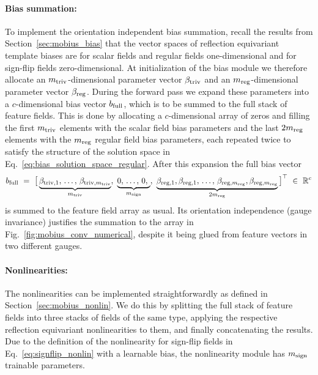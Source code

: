 \paragraph{Bias summation:}
To implement the orientation independent bias summation, recall the results from Section~\ref{sec:mobius_bias} that the vector spaces of reflection equivariant template biases are for scalar fields and regular fields one-dimensional and for sign-flip fields zero-dimensional.
At initialization of the bias module we therefore allocate an $m_{\textup{triv}}$-dimensional parameter vector $\beta_{\textup{triv}}$ and an $m_{\textup{reg}}$-dimensional parameter vector $\beta_{\textup{reg}}$.
During the forward pass we expand these parameters into a $c$-dimensional bias vector $b_{\textup{full}}$, which is to be summed to the full stack of feature fields.
This is done by allocating a $c$-dimensional array of zeros and filling the first $m_{\textup{triv}}$ elements with the scalar field bias parameters and the last $2m_{\textup{reg}}$ elements with the $m_{\textup{reg}}$ regular field bias parameters, each repeated twice to satisfy the structure of the solution space in Eq.~\eqref{eq:bias_solution_space_regular}.
After this expansion the full bias vector
\begin{align}
    b_{\textup{full}}\ =\ \big[
        \underbrace{
            \beta_{\textup{triv},1}, \,\dots,\, \beta_{\textup{triv}, m_{\textup{triv}}}
        }_{m_{\textup{triv}}},\ 
        \underbrace{
            0, \,\dots,\, 0,\ 
        }_{m_{\textup{sign}}},\ 
        \underbrace{
            \beta_{\textup{reg},1},\beta_{\textup{reg},1}, \,\dots,\, \beta_{\textup{reg}, m_{\textup{reg}}}, \beta_{\textup{reg}, m_{\textup{reg}}}
        }_{2m_{\textup{reg}}}
    \big]^\top \ \in\ \R^c
\end{align}
is summed to the feature field array as usual.
Its orientation independence (gauge invariance) justifies the summation to the array in Fig.~\ref{fig:mobius_conv_numerical}, despite it being glued from feature vectors in two different gauges.



\paragraph{Nonlinearities:}
The nonlinearities can be implemented straightforwardly as defined in Section~\ref{sec:mobius_nonlin}.
We do this by splitting the full stack of feature fields into three stacks of fields of the same type, applying the respective reflection equivariant nonlinearities to them, and finally concatenating the results.
Due to the definition of the nonlinearity for sign-flip fields in Eq.~\eqref{eq:signflip_nonlin} with a learnable bias, the nonlinearity module has $m_{\textup{sign}}$ trainable parameters.




